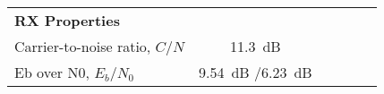 \begin{table}[htbp]
\begin{tabular}{lccccr}
    \rowcolor[rgb]{ 0,  0,  0} \textcolor[rgb]{ 1,  1,  1}{\textbf{RX Properties}}	& \textcolor[rgb]{ 1,  1,  1}{\textbf{}} 		\\
    Carrier-to-noise ratio, $C/N$ 					& \SI{11.3}{dB}										\\
    Eb over N0, $E_b/N_0$ 					& \SI{9.54}{dB} /\SI{ 6.23}{dB}					\\
    \end{tabular}
  \label{tab:link_budget}

\end{table}
